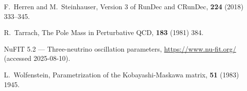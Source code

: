 \documentclass[11pt]{article}
\begin{document}
\begin{thebibliography}{99}
F.~Herren and M.~Steinhauser,
\newblock Version 3 of RunDec and CRunDec,
 {\bf 224} (2018) 333--345.

R.~Tarrach,
\newblock The Pole Mass in Perturbative QCD,
 {\bf 183} (1981) 384.

NuFIT 5.2 --- Three-neutrino oscillation parameters,
\newblock \url{https://www.nu-fit.org/} (accessed 2025-08-10).

L.~Wolfenstein,
\newblock Parametrization of the Kobayashi-Maskawa matrix,
 {\bf 51} (1983) 1945.

\end{thebibliography}
\end{document}
